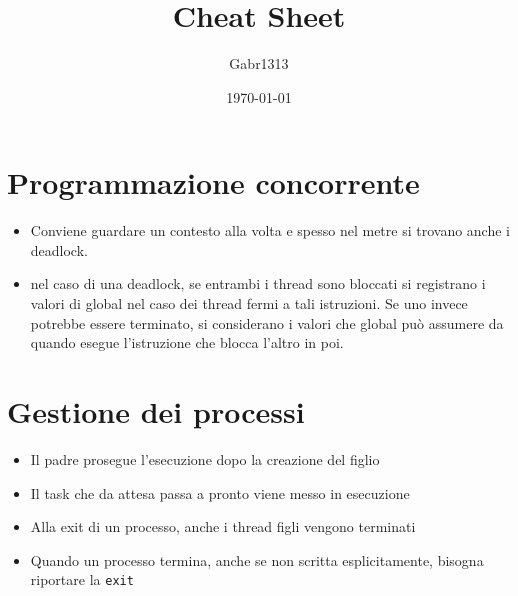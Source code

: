\documentclass[12pt, a4paper]{report}
\title{Cheat Sheet}
\author{Gabr1313}
\date{\today}
\begin{document}
\justify
\sloppy
\maketitle

\section*{Programmazione concorrente}
\begin{itemize}
	\item Conviene guardare un contesto alla volta e spesso nel metre si trovano
	      anche i deadlock.
	\item nel caso di una deadlock, se entrambi i thread sono bloccati si
	      registrano i valori di global nel caso dei thread fermi a tali
	      istruzioni. Se uno invece potrebbe essere terminato, si considerano i
	      valori che global può assumere da quando esegue l'istruzione che blocca
	      l'altro in poi.
\end{itemize}

\newpage
\section*{Gestione dei processi}
\begin{itemize}
	\item Il padre prosegue l'esecuzione dopo la creazione del figlio
	\item Il task che da attesa passa a pronto viene messo in esecuzione
	\item Alla exit di un processo, anche i thread figli vengono terminati
	\item Quando un processo termina, anche se non scritta esplicitamente,
	      bisogna riportare la \texttt{exit}
\end{itemize}


\newpage
\end{document}
